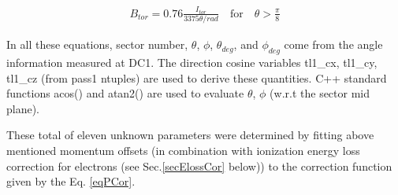 \begin{eqnarray}
\label{eqBtor2}
B_{tor} = 0.76 \frac{I_{tor}}{3375\theta/rad}  \quad  \textrm{for}  \quad  \theta > \frac{\pi}{8}
\end{eqnarray}

In all these equations, sector number, $\theta$, $\phi$, $\theta_{deg}$, and $\phi_{deg}$ come from the angle information measured at DC1. The direction cosine variables tl1\_cx, tl1\_cy, tl1\_cz (from pass1 ntuples) are used to derive these quantities. C++ standard functions acos() and atan2() are used to evaluate $\theta$, $\phi$ (w.r.t the sector mid plane). %



These total of eleven unknown parameters were determined by fitting above mentioned momentum offsets (in combination with ionization energy loss correction for electrons (see Sec.\ref{secElossCor} below)) to the correction function given by the Eq. \ref{eqPCor}.




